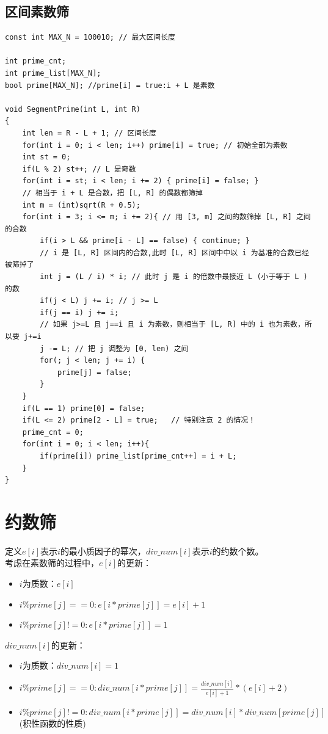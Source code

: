 \subsection{区间素数筛}
\begin{lstlisting}
const int MAX_N = 100010; // 最大区间长度

int prime_cnt;
int prime_list[MAX_N];
bool prime[MAX_N]; //prime[i] = true:i + L 是素数

void SegmentPrime(int L, int R)
{
    int len = R - L + 1; // 区间长度
    for(int i = 0; i < len; i++) prime[i] = true; // 初始全部为素数
    int st = 0;
    if(L % 2) st++; // L 是奇数
    for(int i = st; i < len; i += 2) { prime[i] = false; }
    // 相当于 i + L 是合数，把 [L, R] 的偶数都筛掉
    int m = (int)sqrt(R + 0.5);
    for(int i = 3; i <= m; i += 2){ // 用 [3, m] 之间的数筛掉 [L, R] 之间的合数
        if(i > L && prime[i - L] == false) { continue; }
        // i 是 [L, R] 区间内的合数,此时 [L, R] 区间中中以 i 为基准的合数已经被筛掉了
        int j = (L / i) * i; // 此时 j 是 i 的倍数中最接近 L (小于等于 L )的数
        if(j < L) j += i; // j >= L
        if(j == i) j += i;
        // 如果 j>=L 且 j==i 且 i 为素数，则相当于 [L, R] 中的 i 也为素数，所以要 j+=i
        j -= L; // 把 j 调整为 [0, len) 之间
        for(; j < len; j += i) {
            prime[j] = false;
        }
    }
    if(L == 1) prime[0] = false;
    if(L <= 2) prime[2 - L] = true;   // 特别注意 2 的情况！
    prime_cnt = 0;
    for(int i = 0; i < len; i++){
        if(prime[i]) prime_list[prime_cnt++] = i + L;
    }
}
\end{lstlisting}

\section{约数筛}
定义$e[i]$表示$i$的最小质因子的幂次，$div\_num[i]$表示$i$的约数个数。 \\
考虑在素数筛的过程中，$e[i]$的更新：
\begin{itemize}
\item $i$为质数：$e[i]$
\item $i \% prime[j]==0:e[i*prime[j]]=e[i]+1$
\item $i \% prime[j]!=0:e[i*prime[j]]=1$
\end{itemize}
$div\_num[i]$的更新：
\begin{itemize}
\item $i$为质数：$div\_num[i]=1$
\item $i \% prime[j]==0:div\_num[i*prime[j]]=\frac{div\_num[i]}{e[i]+1}*(e[i]+2)$
\item $i \% prime[j]!=0:div\_num[i*prime[j]]=div\_num[i]*div\_num[prime[j]]\quad $(积性函数的性质)
\end{itemize}


